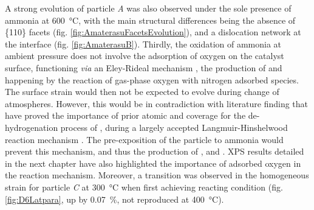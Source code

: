 A strong evolution of particle \textit{A} was also observed under the sole presence of ammonia at \qty{600}{\degreeCelsius}, with the main structural differences being the absence of \{110\} facets (fig. \ref{fig:AmaterasuFacetsEvolution}), and a dislocation network at the interface (fig. \ref{fig:AmaterasuB}).
Thirdly, the oxidation of ammonia at ambient pressure does not involve the adsorption of oxygen on the catalyst surface, functioning \textit{via} an Eley-Rideal mechanism \parencite{Rideal1939}, the production of  and  happening by the reaction of gas-phase oxygen with nitrogen adsorbed species.
The surface strain would then not be expected to evolve during change of atmospheres.
However, this would be in contradiction with literature finding that have proved the importance of prior atomic  and  coverage for the de-hydrogenation process of , during a largely accepted Langmuir-Hinshelwood reaction mechanism \parencite{Bradley1995, Mieher1995,vandenBroek1999, Kim2000}.
The pre-exposition of the particle to ammonia would prevent this mechanism, and thus the production of ,  and .
XPS results detailed in the next chapter have also highlighted the importance of adsorbed oxygen in the reaction mechanism.
Moreover, a transition was observed in the homogeneous strain for particle \textit{C} at \qty{300}{\degreeCelsius} when first achieving reacting condition (fig. \ref{fig:D6Latpara}, up by \qty{0.07}{\percent}, not reproduced at \qty{400}{\degreeCelsius}).


